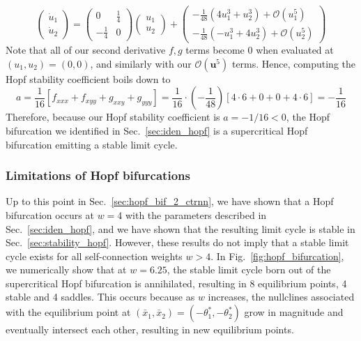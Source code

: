 \documentclass[11pt, letterpaper]{article}
\begin{document}
\begin{equation}\label{eq:stability_formula_in_ctrnn}
    \begin{pmatrix}
        \dot{u}_1\\\dot{u}_2
    \end{pmatrix}=\begin{pmatrix}
        0 & \frac{1}{4}\\
        -\frac{1}{4} & 0
    \end{pmatrix}\begin{pmatrix}
        u_1 \\ u_2
    \end{pmatrix} + \begin{pmatrix}
        -\frac{1}{48}\left(4u^3_1 + u^3_2\right) + \mathcal{O}( u_1^5)\\ -\frac{1}{48}\left(-u^3_1 + 4u^3_2\right)+ \mathcal{O}( u_2^5)
    \end{pmatrix}
\end{equation}
Note that all of our second derivative $f,g$ terms become $0$ when evaluated at $(u_1,u_2)=(0,0)$, and similarly with our $\mathcal{O}( \mathbf{u}^5)$ terms. Hence, computing the Hopf stability coefficient boils down to 
\begin{equation*}
    a=\frac{1}{16}\left[ f_{xxx} + f_{xyy} + g_{xxy} + g_{yyy} \right]=\frac{1}{16}\cdot \left(-\frac{1}{48}\right)\left[ 4\cdot 6 + 0 + 0 + 4\cdot 6 \right]= -\frac{1}{16}
\end{equation*}
Therefore, because our Hopf stability coefficient is $a=-1/16<0$, the Hopf bifurcation we identified in Sec.~\ref{sec:iden_hopf} is a supercritical Hopf bifurcation emitting a stable limit cycle.

\subsubsection{Limitations of Hopf bifurcations}

Up to this point in Sec.~\ref{sec:hopf_bif_2_ctrnn}, we have shown that a Hopf bifurcation occurs at $w=4$ with the parameters described in Sec.~\ref{sec:iden_hopf}, and we have shown that the resulting limit cycle is stable in Sec.~\ref{sec:stability_hopf}. However, these results do not imply that a stable limit cycle exists for all self-connection weights $w>4$. In Fig.~\ref{fig:hopf_bifurcation}, we numerically show that at $w=6.25$, the stable limit cycle born out of the supercritical Hopf bifurcation is annihilated, resulting in 8 equilibrium points, 4 stable and 4 saddles. This occurs because as $w$ increases, the nullclines associated with the equilibrium point at $(\bar{x}_1,\bar{x}_2)=(-\theta^\ast_1,-\theta^\ast_2)$ grow in magnitude and eventually intersect each other, resulting in new equilibrium points.
\end{document}

